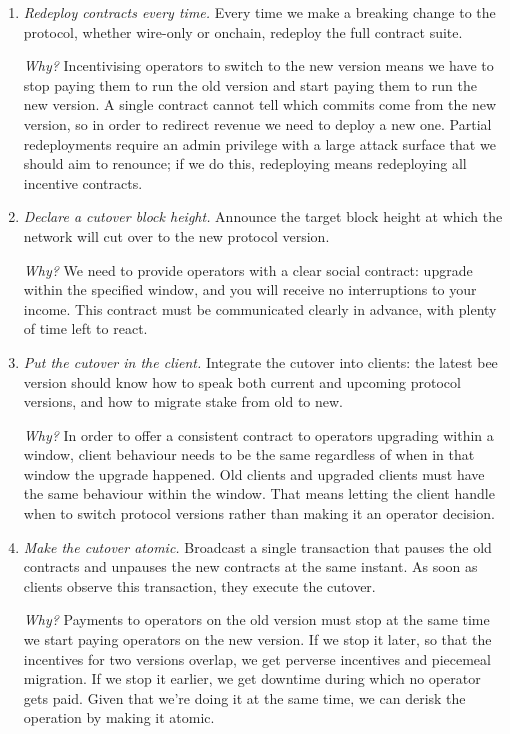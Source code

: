 \begin{enumerate}
  \item \emph{Redeploy contracts every time.} Every time we make a breaking change to the protocol, whether wire-only or onchain, redeploy the full contract suite.

  \emph{Why?} Incentivising operators to switch to the new version means we have to stop paying them to run the old version and start paying them to run the new version.
  A single  contract cannot tell which commits come from the new version, so in order to redirect revenue we need to deploy a new one.
  Partial redeployments require an admin privilege with a large attack surface that we should aim to renounce; if we do this, redeploying  means redeploying all incentive contracts.

  \item \emph{Declare a cutover block height.} Announce the target block height at which the network will cut over to the new protocol version.

  \emph{Why?} We need to provide operators with a clear social contract: upgrade within the specified window, and you will receive no interruptions to your income.
  This contract must be communicated clearly in advance, with plenty of time left to react.

  \item \emph{Put the cutover in the client.} Integrate the cutover into clients: the latest bee version should know how to speak both current and upcoming protocol versions, and how to migrate stake from old to new.
  
  \emph{Why?} In order to offer a consistent contract to operators upgrading within a window, client behaviour needs to be the same regardless of when in that window the upgrade happened.
  Old clients and upgraded clients must have the same behaviour within the window.
  That means letting the client handle when to switch protocol versions rather than making it an operator decision.

  \item \emph{Make the cutover atomic.} Broadcast a single transaction  that pauses the old contracts and unpauses the new contracts at the same instant. As soon as clients observe this transaction, they execute the cutover.

  \emph{Why?} Payments to operators on the old version must stop at the same time we start paying operators on the new version.
  If we stop it later, so that the incentives for two versions overlap, we get perverse incentives and piecemeal migration.
  If we stop it earlier, we get downtime during which no operator gets paid.
  Given that we're doing it at the same time, we can derisk the operation by making it atomic.
\end{enumerate}


